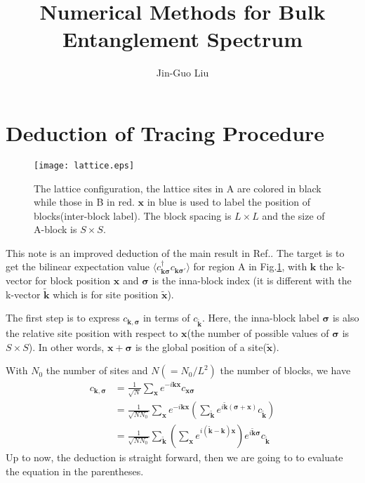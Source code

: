 \documentclass[prb,twocolumn,showpacs,superscriptaddress]{revtex4-1}
\newcommand{\Ref}[1]{Ref.\onlinecite{#1}}
\newcommand{\tk}{\tilde{\mathbf{k}}}
\renewcommand{\k}{\mathbf{k}}
\newcommand{\x}{\mathbf{x}}
\newcommand{\tx}{\tilde{\mathbf{x}}}
\newcommand{\sig}{\mathbf{\sigma}}
\begin{document}
\title{Numerical Methods for Bulk Entanglement Spectrum}

\author{Jin-Guo Liu}


%

\maketitle

\section{Deduction of Tracing Procedure}

\begin{figure}
\texttt{[image: lattice.eps]}
\caption{The lattice configuration, the lattice sites in A are colored in black while those in B in red.
$\x$ in blue is used to label the position of blocks(inter-block label). The block spacing is $L\times L$ and the size of A-block is $S\times S$.}
\label{lattice}
\end{figure}

This note is an improved deduction of the main result in \Ref{Hsieh2014}.
The target is to get the bilinear expectation value $\langle c^\dag_{\k\sig} c_{\k\sig'}\rangle$ for region A in Fig.\ref{lattice},
with $\k$ the k-vector for block position $\x$ and $\sig$ is the inna-block index
(it is different with the k-vector $\tk$ which is for site position $\tx$).

The first step is to express $c_{\k,\sig}$ in terms of $c_{\tk}$.
Here, the inna-block label $\sig$ is also the relative site position with respect to $\x$(the number of possible values of $\sig$ is $S\times S$).
In other words, $\x+\sig$ is the global position of a site($\tx$).

With $N_0$ the number of sites and $N(=N_0/L^2)$ the number of blocks, we have
\begin{align}
    c_{\k,\sig}&=\frac{1}{\sqrt{N}}\sum\limits_{\x}e^{-i\k\x}c_{\x\sig}\\
                &=\frac{1}{\sqrt{NN_0}}\sum\limits_{\x}e^{-i\k\x}\left(\sum\limits_{\tk}e^{i\tk(\sig+\x)}c_{\tk}\right)\\
                &=\frac{1}{\sqrt{NN_0}}\sum\limits_{\tk}\left(\sum\limits_{\x}e^{i(\tk-\k)\x}\right)e^{i\tk \sig}c_{\tk}
\end{align}
Up to now, the deduction is straight forward, then we are going to to evaluate the equation in the parentheses.
\end{document}
